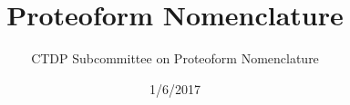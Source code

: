  


\title{Proteoform Nomenclature}
\author{CTDP Subcommittee on Proteoform Nomenclature} 
\date{1/6/2017}



\onehalfspacing
\maketitle








